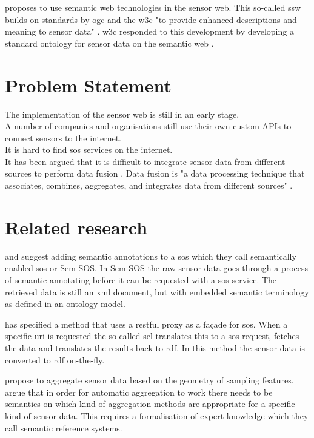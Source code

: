 \cite{SSW:Sheth} proposes to use semantic web technologies in the sensor web. This so-called \ac{ssw} builds on standards by \ac{ogc} and the \ac{w3c} "to provide enhanced descriptions and meaning to sensor data" \cite[p.78]{SSW:Sheth}. \ac{w3c} responded to this development by developing a standard ontology for sensor data on the semantic web \citep{SSW:SSN_incubatorGroup}. 
 
\section{Problem Statement}
The implementation of the sensor web is still in an early stage. \\

A number of companies and organisations still use their own custom APIs to connect sensors to the internet. \\

It is hard to find \ac{sos} services on the internet. \\

It has been argued that it is difficult to integrate sensor data from different sources to perform data fusion \citep{SSW:Corcho, SSW:Ji, SSW:Wang}. Data fusion is "a data processing technique that associates, combines, aggregates, and integrates data from different sources" \cite[p. 2]{SSW:Perera}. \\


\section{Related research}
\cite{SSW:Henson} and \cite{SSW:Pschorr} suggest adding semantic annotations to a \ac{sos} which they call semantically enabled \ac{sos} or Sem-SOS. In Sem-SOS the raw sensor data goes through a process of semantic annotating before it can be requested with a \ac{sos} service. The retrieved data is still an \ac{xml} document, but with embedded semantic terminology as defined in an ontology model. 

\cite{SSW:Janowicz} has specified a method that uses a \ac{rest}ful proxy as a fa\c{c}ade for \ac{sos}. When a specific \ac{uri} is requested the so-called \ac{sel} translates this to a \ac{sos} request, fetches the data and translates the results back to \ac{rdf}. In this method the sensor data is converted to \ac{rdf} on-the-fly.  

\cite{SSW:Stasch} propose to aggregate sensor data based on the geometry of sampling features. \cite{SSW:Stasch4} argue that in order for automatic aggregation to work there needs to be semantics on which kind of aggregation methods are appropriate for a specific kind of sensor data. This requires a formalisation of expert knowledge which they call semantic reference systems.

